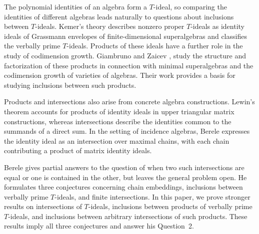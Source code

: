\documentclass[11pt,reqno]{amsart}
\theoremstyle{definition}
\theoremstyle{remark}
\numberwithin{equation}{section}
\begin{document}
The polynomial identities of an algebra form a $T$-ideal,
so comparing the identities of different algebras leads
naturally to questions about inclusions between $T$-ideals.
Kemer's theory
\cite{Kemer1991} describes nonzero proper $T$-ideals as identity
ideals of Grassmann envelopes of finite-dimensional superalgebras
and classifies the verbally prime $T$-ideals. Products of these
ideals have a further role in the study of codimension growth.
Giambruno and Zaicev
\cite{GiambrunoZaicev2003},  \cite{GiambrunoZaicev2005}
study the structure and factorization of these products
in connection with minimal superalgebras and the codimension
growth of varieties of algebras.
Their work provides a basis for studying inclusions between
such products.





Products and intersections also arise from concrete algebra
constructions. Lewin's theorem \cite{Lewin1974} accounts for
products of identity ideals in upper triangular matrix
constructions, whereas intersections describe the identities
common to the summands of a direct sum. In the setting of
incidence algebras, Berele \cite{Berele1984} expresses the
identity ideal as an intersection over maximal chains, with
each chain contributing a product of matrix identity ideals.

Berele \cite{Berele2012} gives partial answers to the question
of when two such intersections are equal or one is contained
in the other, but leaves the general problem open.
He formulates three conjectures concerning chain embeddings,
inclusions between verbally prime $T$-ideals, and finite
intersections.
In this paper, we prove stronger results on intersections of
$T$-ideals, inclusions between products of verbally prime
$T$-ideals, and inclusions between arbitrary intersections
of such products.
 These results imply all three
conjectures and answer his Question~2.
\end{document}
